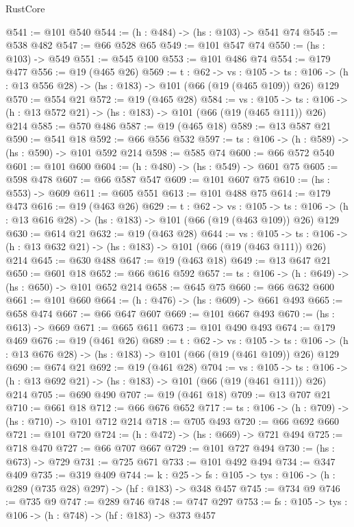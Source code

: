 \begin{lexlean}{RustCore}
\begin{coremodule}
@541 := @101 @540
@544 := (h : @484) -> (hs : @103) -> @541 @74
@545 := @538 @482
@547 := @66 @528 @65
@549 := @101 @547 @74
@550 := (hs : @103) -> @549
@551 := @545 @100
@553 := @101 @486 @74
@554 := @179 @477
@556 := @19 (@465 @26)
@569 := {t : @62} ->
  {vs : @105} ->
  {ts : @106} -> (h : @13 @556 @28) -> (hs : @183) -> @101 (@66 (@19 (@465 @109)) @26) @129
@570 := @554 @21
@572 := @19 (@465 @28)
@584 := {vs : @105} ->
  {ts : @106} -> (h : @13 @572 @21) -> (hs : @183) -> @101 (@66 (@19 (@465 @111)) @26) @214
@585 := @570 @486
@587 := @19 (@465 @18)
@589 := @13 @587 @21
@590 := @541 @18
@592 := @66 @556 @532
@597 := {ts : @106} -> (h : @589) -> (hs : @590) -> @101 @592 @214
@598 := @585 @74
@600 := @66 @572 @540
@601 := @101 @600
@604 := (h : @480) -> (hs : @549) -> @601 @75
@605 := @598 @478
@607 := @66 @587 @547
@609 := @101 @607 @75
@610 := (hs : @553) -> @609
@611 := @605 @551
@613 := @101 @488 @75
@614 := @179 @473
@616 := @19 (@463 @26)
@629 := {t : @62} ->
  {vs : @105} ->
  {ts : @106} -> (h : @13 @616 @28) -> (hs : @183) -> @101 (@66 (@19 (@463 @109)) @26) @129
@630 := @614 @21
@632 := @19 (@463 @28)
@644 := {vs : @105} ->
  {ts : @106} -> (h : @13 @632 @21) -> (hs : @183) -> @101 (@66 (@19 (@463 @111)) @26) @214
@645 := @630 @488
@647 := @19 (@463 @18)
@649 := @13 @647 @21
@650 := @601 @18
@652 := @66 @616 @592
@657 := {ts : @106} -> (h : @649) -> (hs : @650) -> @101 @652 @214
@658 := @645 @75
@660 := @66 @632 @600
@661 := @101 @660
@664 := (h : @476) -> (hs : @609) -> @661 @493
@665 := @658 @474
@667 := @66 @647 @607
@669 := @101 @667 @493
@670 := (hs : @613) -> @669
@671 := @665 @611
@673 := @101 @490 @493
@674 := @179 @469
@676 := @19 (@461 @26)
@689 := {t : @62} ->
  {vs : @105} ->
  {ts : @106} -> (h : @13 @676 @28) -> (hs : @183) -> @101 (@66 (@19 (@461 @109)) @26) @129
@690 := @674 @21
@692 := @19 (@461 @28)
@704 := {vs : @105} ->
  {ts : @106} -> (h : @13 @692 @21) -> (hs : @183) -> @101 (@66 (@19 (@461 @111)) @26) @214
@705 := @690 @490
@707 := @19 (@461 @18)
@709 := @13 @707 @21
@710 := @661 @18
@712 := @66 @676 @652
@717 := {ts : @106} -> (h : @709) -> (hs : @710) -> @101 @712 @214
@718 := @705 @493
@720 := @66 @692 @660
@721 := @101 @720
@724 := (h : @472) -> (hs : @669) -> @721 @494
@725 := @718 @470
@727 := @66 @707 @667
@729 := @101 @727 @494
@730 := (hs : @673) -> @729
@731 := @725 @671
@733 := @101 @492 @494
@734 := @347 @409
@735 := @319 @409
@744 := {k : @25} ->
  {fs : @105} -> {tys : @106} -> (h : @289 (@735 @28) @297) -> (hf : @183) -> @348 @457
@745 := @734 @9
@746 := @735 @9
@747 := @289 @746
@748 := @747 @297
@753 := {fs : @105} -> {tys : @106} -> (h : @748) -> (hf : @183) -> @373 @457

\end{coremodule}
\end{lexlean}
